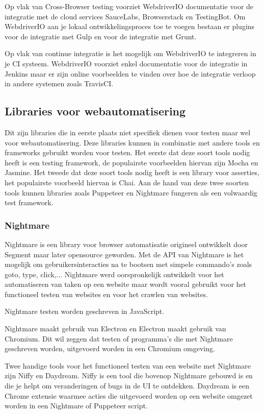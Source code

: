 Op vlak van Cross-Browser testing voorziet WebdriverIO documentatie voor de integratie met de cloud services SauceLabs, Browserstack en TestingBot. Om WebdriverIO aan je lokaal ontwikkelingsproces toe te voegen bestaan er plugins voor de integratie met Gulp en voor de integratie met Grunt.

Op vlak van continue integratie is het mogelijk om WebdriverIO te integreren in je CI systeem. WebdriverIO voorziet enkel documentatie voor de integratie in Jenkins maar er zijn online voorbeelden te vinden over hoe de integratie verloop in andere systemen zoals TravisCI.

\subsection{Libraries voor webautomatisering}

Dit zijn libraries die in eerste plaats niet specifiek dienen voor testen maar wel voor webautomatisering. Deze libraries kunnen in combinatie met andere tools en frameworks gebruikt worden voor testen. Het eerste dat deze soort tools nodig heeft is een testing framework, de populairste voorbeelden hiervan zijn Mocha en Jasmine. Het tweede dat deze soort tools nodig heeft is een library voor asserties, het populairste voorbeeld hiervan is Chai. Aan de hand van deze twee soorten tools kunnen libraries zoals Puppeteer en Nightmare fungeren als een volwaardig test framework.

\subsubsection{Nightmare}

Nightmare is een library voor browser automatisatie origineel ontwikkelt door Segment maar later opensource geworden. Met de API van Nightmare is het mogelijk om gebruikersinteracties na te bootsen met simpele commando's zoals goto, type, click,... Nightmare werd oorspronkelijk ontwikkelt voor het automatiseren van taken op een website maar wordt vooral gebruikt voor het functioneel testen van websites en voor het crawlen van websites.

Nightmare testen worden geschreven in JavaScript.

Nightmare maakt gebruik van Electron en Electron maakt gebruik van Chromium. Dit wil zeggen dat testen of programma's die met Nightmare geschreven worden, uitgevoerd worden in een Chromium omgeving.

Twee handige tools voor het functioneel testen van een website met Nightmare zijn Niffy en Daydream. Niffy is een tool die bovenop Nightmare gebouwd is en die je helpt om veranderingen of bugs in de UI te ontdekken. Daydream is een Chrome extensie waarmee acties die uitgevoerd worden op een website omgezet worden in een Nightmare of Puppeteer script.


